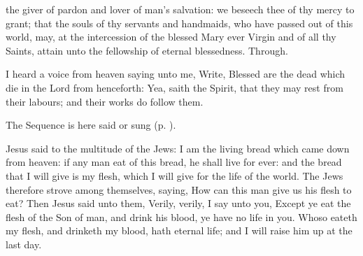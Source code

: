 \collect
{} the giver of pardon and lover of man's salvation: we beseech thee of thy mercy to grant; that the souls of thy servants and handmaids, who have passed out of this world, may, at the intercession of the blessed Mary ever Virgin and of all thy Saints, attain unto the fellowship of eternal blessedness. Through.

 I heard a voice from heaven saying unto me, Write, Blessed are the dead which die in the Lord from henceforth: Yea, saith the Spirit, that they may rest from their labours; and their works do follow them.


\begin{rubric}
    The Sequence  is here said or sung (p. \pageref{diesirae}).
\end{rubric}

 Jesus said to the multitude of the Jews: I am the living bread which came down from heaven: if any man eat of this bread, he shall live for ever: and the bread that I will give is my flesh, which I will give for the life of the world. The Jews therefore strove among themselves, saying, How can this man give us his flesh to eat? Then Jesus said unto them, Verily, verily, I say unto you, Except ye eat the flesh of the Son of man, and drink his blood, ye have no life in you. Whoso eateth my flesh, and drinketh my blood, hath eternal life; and I will raise him up at the last day.


